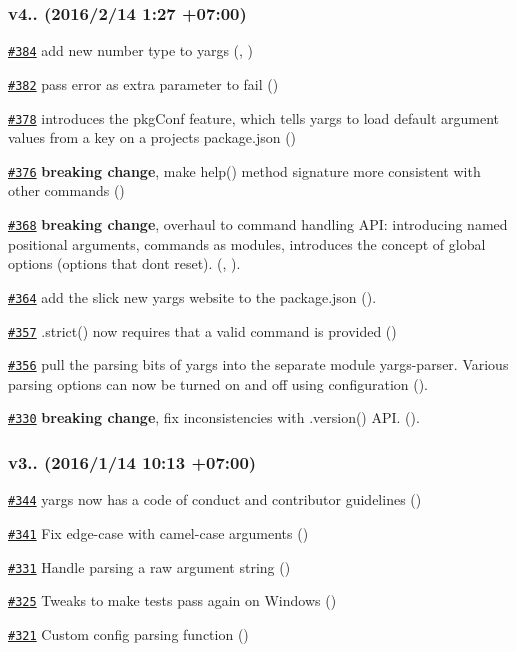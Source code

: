 \subsubsection*{v4.. (2016/2/14 1\+:27 +07\+:00)}


\begin{DoxyItemize}
\item \href{https://github.com/bcoe/yargs/pull/384}{\tt \#384} add new number type to yargs (, )
\item \href{https://github.com/bcoe/yargs/pull/382}{\tt \#382} pass error as extra parameter to fail ()
\item \href{https://github.com/bcoe/yargs/pull/378}{\tt \#378} introduces the pkg\+Conf feature, which tells yargs to load default argument values from a key on a project\textquotesingle{}s package.\+json ()
\item \href{https://github.com/bcoe/yargs/pull/376}{\tt \#376} {\bfseries breaking change}, make help() method signature more consistent with other commands ()
\item \href{https://github.com/bcoe/yargs/pull/368}{\tt \#368} {\bfseries breaking change}, overhaul to command handling A\+PI\+: introducing named positional arguments, commands as modules, introduces the concept of global options (options that don\textquotesingle{}t reset). (, ).
\item \href{https://github.com/bcoe/yargs/pull/364}{\tt \#364} add the slick new yargs website to the package.\+json ().
\item \href{https://github.com/bcoe/yargs/pull/357}{\tt \#357} .strict() now requires that a valid command is provided ()
\item \href{https://github.com/bcoe/yargs/pull/356}{\tt \#356} pull the parsing bits of yargs into the separate module yargs-\/parser. Various parsing options can now be turned on and off using configuration ().
\item \href{https://github.com/bcoe/yargs/pull/330}{\tt \#330} {\bfseries breaking change}, fix inconsistencies with {\ttfamily .version()} A\+PI. ().
\end{DoxyItemize}

\subsubsection*{v3.. (2016/1/14 10\+:13 +07\+:00)}


\begin{DoxyItemize}
\item \href{https://github.com/bcoe/yargs/pull/344}{\tt \#344} yargs now has a code of conduct and contributor guidelines ()
\item \href{https://github.com/bcoe/yargs/issues/341}{\tt \#341} Fix edge-\/case with camel-\/case arguments ()
\item \href{https://github.com/bcoe/yargs/pull/331}{\tt \#331} Handle parsing a raw argument string ()
\item \href{https://github.com/bcoe/yargs/pull/325}{\tt \#325} Tweaks to make tests pass again on Windows ()
\item \href{https://github.com/bcoe/yargs/pull/321}{\tt \#321} Custom config parsing function ()
\end{DoxyItemize}

